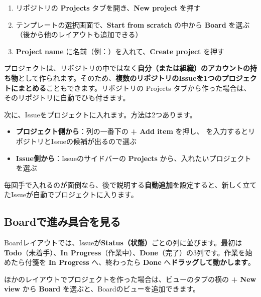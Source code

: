 \begin{enumerate}[leftmargin=1.6em]
  \item リポジトリの \textbf{Projects} タブを開き、\textbf{New project} を押す
  \item テンプレートの選択画面で、\textbf{Start from scratch} の中から \textbf{Board} を選ぶ（後から他のレイアウトも追加できる）
  \item \textbf{Project name} に名前（例：）を入れて、\textbf{Create project} を押す
\end{enumerate}

プロジェクトは、リポジトリの中ではなく\textbf{自分（または組織）のアカウントの持ち物}として作られます。そのため、\textbf{複数のリポジトリのIssueを1つのプロジェクトにまとめる}こともできます。リポジトリの Projects タブから作った場合は、そのリポジトリに自動でひも付きます。

次に、Issueをプロジェクトに入れます。方法は2つあります。

\begin{itemize}[leftmargin=1.4em]
  \item \textbf{プロジェクト側から}：列の一番下の \textbf{+ Add item} を押し、\cmd{\#} を入力するとリポジトリとIssueの候補が出るので選ぶ
  \item \textbf{Issue側から}：Issueのサイドバーの \textbf{Projects} から、入れたいプロジェクトを選ぶ
\end{itemize}

毎回手で入れるのが面倒なら、後で説明する\textbf{自動追加}を設定すると、新しく立てたIssueが自動でプロジェクトに入ります。

\subsection{Boardで進み具合を見る}

Boardレイアウトでは、Issueが\textbf{Status（状態）}ごとの列に並びます。最初は \textbf{Todo}（未着手）、\textbf{In Progress}（作業中）、\textbf{Done}（完了）の3列です。作業を始めたら付箋を \textbf{In Progress} へ、終わったら \textbf{Done} へ\textbf{ドラッグして動かします}。

ほかのレイアウトでプロジェクトを作った場合は、ビューのタブの横の \textbf{+ New view} から \textbf{Board} を選ぶと、Boardのビューを追加できます。


